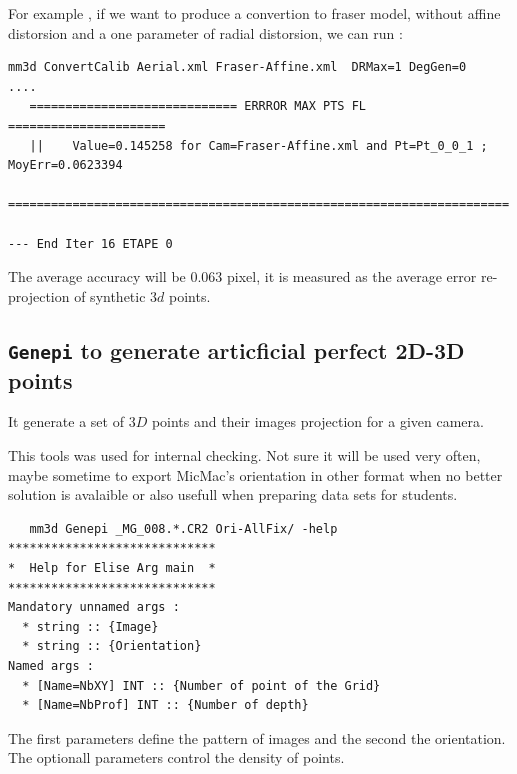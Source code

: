For example , if we want to produce a convertion to fraser model, without affine distorsion and a one parameter of radial
distorsion, we can run :

\begin{verbatim}
mm3d ConvertCalib Aerial.xml Fraser-Affine.xml  DRMax=1 DegGen=0
....
   ============================= ERRROR MAX PTS FL ======================
   ||    Value=0.145258 for Cam=Fraser-Affine.xml and Pt=Pt_0_0_1 ; MoyErr=0.0623394
   ======================================================================

--- End Iter 16 ETAPE 0

\end{verbatim}


The average accuracy will be $0.063$ pixel, it is measured as the average error re-projection of  synthetic $3d$ points.



\subsection{{\tt Genepi} to generate articficial perfect 2D-3D points}

It generate a set of $3D$ points and their images projection for a given camera.

This tools was used for internal checking. Not sure it will be used very often, maybe sometime to export 
MicMac's orientation in other format when no better solution is avalaible or also usefull when preparing
data sets for students.

\begin{verbatim}
   mm3d Genepi _MG_008.*.CR2 Ori-AllFix/ -help
*****************************
*  Help for Elise Arg main  *
*****************************
Mandatory unnamed args : 
  * string :: {Image}
  * string :: {Orientation}
Named args : 
  * [Name=NbXY] INT :: {Number of point of the Grid}
  * [Name=NbProf] INT :: {Number of depth}

\end{verbatim}

The first parameters define the  pattern of images and the second the orientation. The optionall parameters control
the density of points.



















